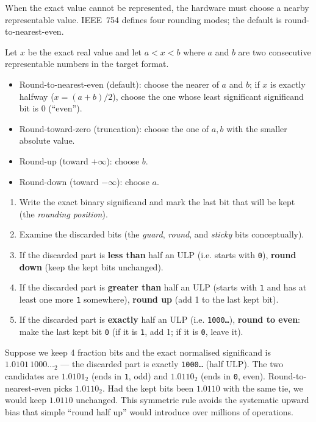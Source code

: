 \documentclass[11pt]{article}
\newcommand{\cle}[1]{{\popxbold\color{popdark}#1}}
\newcounter{popsec}
\newcounter{popsub}
\newcommand{\courssub}[1]{%
  \stepcounter{popsub}%
  \par\vspace{9pt}\noindent{\popxbold\fontsize{11.5}{13}\selectfont\color{popink}{\color{poporange}\thepopsec.\thepopsub}\hspace{6pt}#1}\par\nopagebreak\vspace{4pt}
}
\begin{document}
\courssub{Rounding Modes}

When the exact value cannot be represented, the hardware must choose a nearby representable value. IEEE~754 defines four rounding modes; the default is round-to-nearest-even.

\begin{definition}
Let $x$ be the exact real value and let $a < x < b$ where $a$ and $b$ are two consecutive representable numbers in the target format.
\begin{itemize}
\item \cle{Round-to-nearest-even} (default): choose the nearer of $a$ and $b$; if $x$ is exactly halfway ($x = (a+b)/2$), choose the one whose least significant significand bit is $0$ (``even'').
\item \cle{Round-toward-zero} (truncation): choose the one of $a,b$ with the smaller absolute value.
\item \cle{Round-up} (toward $+\infty$): choose $b$.
\item \cle{Round-down} (toward $-\infty$): choose $a$.
\end{itemize}
\end{definition}

\begin{methode}
\begin{enumerate}
\item Write the exact binary significand and mark the last bit that will be kept (the \emph{rounding position}).
\item Examine the discarded bits (the \emph{guard}, \emph{round}, and \emph{sticky} bits conceptually).
\item If the discarded part is \textbf{less than} half an ULP (i.e. starts with \texttt{0}), \textbf{round down} (keep the kept bits unchanged).
\item If the discarded part is \textbf{greater than} half an ULP (starts with \texttt{1} and has at least one more \texttt{1} somewhere), \textbf{round up} (add 1 to the last kept bit).
\item If the discarded part is \textbf{exactly} half an ULP (i.e. \texttt{1000\ldots}), \textbf{round to even}: make the last kept bit \texttt{0} (if it is \texttt{1}, add 1; if it is \texttt{0}, leave it).
\end{enumerate}
\end{methode}

\begin{exemplebox}
Suppose we keep 4 fraction bits and the exact normalised significand is $1.0101\,1000\ldots_2$ — the discarded part is exactly \texttt{1000\ldots} (half ULP). The two candidates are $1.0101_2$ (ends in \texttt{1}, odd) and $1.0110_2$ (ends in \texttt{0}, even). Round-to-nearest-even picks $1.0110_2$. Had the kept bits been $1.0110$ with the same tie, we would keep $1.0110$ unchanged. This symmetric rule avoids the systematic upward bias that simple ``round half up'' would introduce over millions of operations.
\end{exemplebox}
\end{document}
